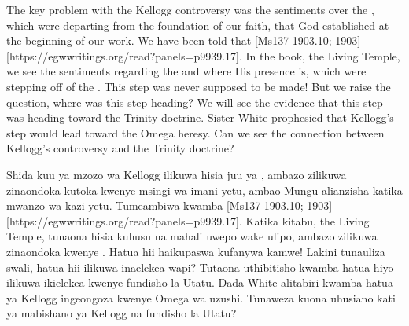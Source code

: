 



The key problem with the Kellogg controversy was the sentiments over the , which were departing from the foundation of our faith, that God established at the beginning of our work. We have been told that [Ms137-1903.10; 1903][https://egwwritings.org/read?panels=p9939.17]. In the book, the Living Temple, we see the sentiments regarding the  and where His presence is, which were stepping off of the . This step was never supposed to be made! But we raise the question, where was this step heading? We will see the evidence that this step was heading toward the Trinity doctrine. Sister White prophesied that Kellogg’s step would lead toward the Omega heresy. Can we see the connection between Kellogg’s controversy and the Trinity doctrine?


Shida kuu ya mzozo wa Kellogg ilikuwa hisia juu ya , ambazo zilikuwa zinaondoka kutoka kwenye msingi wa imani yetu, ambao Mungu alianzisha katika mwanzo wa kazi yetu. Tumeambiwa kwamba [Ms137-1903.10; 1903][https://egwwritings.org/read?panels=p9939.17]. Katika kitabu, the Living Temple, tunaona hisia kuhusu  na mahali uwepo wake ulipo, ambazo zilikuwa zinaondoka kwenye . Hatua hii haikupaswa kufanywa kamwe! Lakini tunauliza swali, hatua hii ilikuwa inaelekea wapi? Tutaona uthibitisho kwamba hatua hiyo ilikuwa ikielekea kwenye fundisho la Utatu. Dada White alitabiri kwamba hatua ya Kellogg ingeongoza kwenye Omega wa uzushi. Tunaweza kuona uhusiano kati ya mabishano ya Kellogg na fundisho la Utatu?


